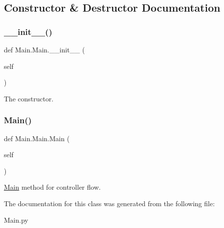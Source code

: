 \subsection{Constructor \& Destructor Documentation}
\mbox{\label{classMain_1_1Main_a25ab3329d16c1a94a9c9f8a2f5de404a}} 
\subsubsection{\texorpdfstring{\+\_\+\+\_\+init\+\_\+\+\_\+()}{\_\_init\_\_()}}
{\footnotesize\ttfamily def Main.\+Main.\+\_\+\+\_\+init\+\_\+\+\_\+ (\begin{DoxyParamCaption}\item[{}]{self }\end{DoxyParamCaption})}



The constructor. 

\mbox{\label{classMain_1_1Main_acb8d882aae5f473b8883a278e1f6ca77}} 
\subsubsection{\texorpdfstring{Main()}{Main()}}
{\footnotesize\ttfamily def Main.\+Main.\+Main (\begin{DoxyParamCaption}\item[{}]{self }\end{DoxyParamCaption})}



\hyperlink{classMain_1_1Main}{Main} method for controller flow. 



The documentation for this class was generated from the following file\+:\begin{DoxyCompactItemize}
\item 
Main.\+py\end{DoxyCompactItemize}
